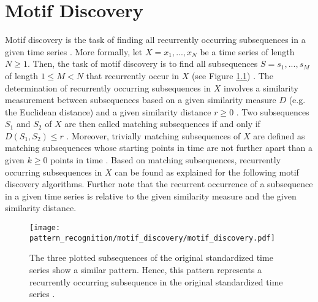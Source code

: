 \chapter{Motif Discovery} \label{subsection_motif_discovery}
Motif discovery is the task of finding all recurrently occurring subsequences in a given time series \cite{Survey_Esling}. More formally, let $X = x_1, ..., x_N$ be a time series of length $N \ge 1$. Then, the task of motif discovery is to find all subsequences $S = s_1, ..., s_M$ of length $1 \leq M < N$ that recurrently occur in $X$ (see Figure \ref{fig:intro_motifs}) \cite{Survey_Esling}. \newline
The determination of recurrently occurring subsequences in $X$ involves a similarity measurement between subsequences based on a given similarity measure $D$ (e.g. the Euclidean distance) and a given similarity distance $r \geq 0$ \cite{Motif_Definitions}. Two subsequences $S_1$ and $S_2$ of $X$ are then called matching subsequences if and only if \mbox{$D(S_1,S_2) \leq r$} \cite{Motif_Definitions}. Moreover, trivially matching subsequences of $X$ are defined as matching subsequences whose starting points in time are not further apart than a given $k \geq 0$ points in time \cite{Motif_Definitions}. Based on matching subsequences, recurrently occurring subsequences in $X$ can be found as explained for the following motif discovery algorithms. Further note that the recurrent occurrence of a subsequence in a given time series is relative to the given similarity measure and the given similarity distance.
\begin{figure}[htb]
\centering
\texttt{[image: pattern\_recognition/motif\_discovery/motif\_discovery.pdf]}
\caption[Motif Discovery - Recurrently Occurring Subsequence]{The three plotted subsequences of the original standardized time series show a similar pattern. Hence, this pattern represents a recurrently occurring subsequence in the original standardized time series \cite{Motif_Definitions}.}
\label{fig:intro_motifs}
\end{figure}

\newpage










